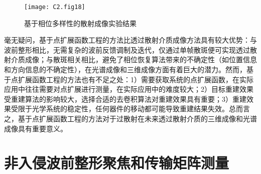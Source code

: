 \begin{figure}[htp]
	\centering
	\texttt{[image: C2.fig18]}
	\caption{基于相位多样性的散射成像实验结果}
	\label{fig2:18}
\end{figure}

毫无疑问，基于点扩展函数工程的方法比透过散射介质成像方法具有较大优势：与波前整形相比，无需复杂的波前反馈调制及迭代，仅通过单帧散斑便可实现透过散射介质成像；与散斑相关相比，避免了相位恢复算法带来的不确定性（如位置信息和方向信息的不确定性），在光谱成像和三维成像方面有着巨大的潜力。然而，基于点扩展函数工程的方法也有不足之处：1）需要获取系统的点扩展函数，在实际应用中往往需要对点扩展进行测量，在实际应用中的难度较大；2）目标重建效果受重建算法的影响较大，选择合适的去卷积算法对重建效果具有重要；3）重建效果受限于光学系统的稳定性，任何器件的移动都可能导致重建结果失效。总而言之，基于点扩展函数工程的方法对于过散射在未来透过散射介质的三维成像和光谱成像具有重要意义。

\section{非入侵波前整形聚焦和传输矩阵测量}
